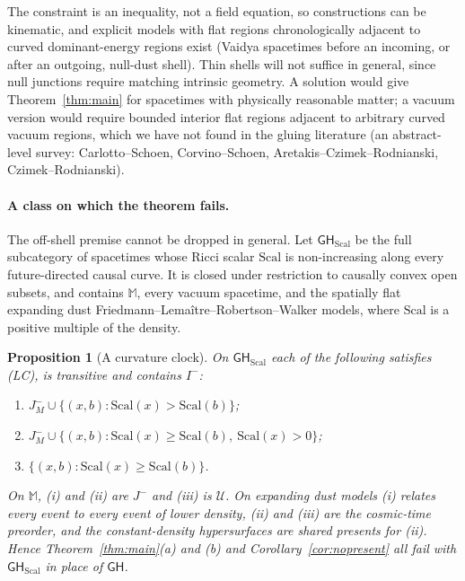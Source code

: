 \documentclass[11pt]{article}
\newtheorem{proposition}[theorem]{Proposition}
\theoremstyle{definition}
\newcommand{\GH}{\mathsf{GH}}
\newcommand{\Mink}{\mathbb M}
\newcommand{\U}{\mathcal U}
\newcommand{\Ichr}{I^{-}}
\newcommand{\Jm}{J^{-}}
\begin{document}
The constraint is an inequality, not a field equation, so constructions can be
kinematic, and explicit models with flat regions chronologically adjacent to
curved dominant-energy regions exist (Vaidya spacetimes before an incoming, or
after an outgoing, null-dust shell). Thin shells will not suffice in general,
since null junctions require matching intrinsic geometry. A solution would
give Theorem~\ref{thm:main} for spacetimes with physically reasonable matter;
a vacuum version would require bounded interior flat regions adjacent to
arbitrary curved vacuum regions, which we have not found in the gluing
literature (an abstract-level survey: Carlotto--Schoen, Corvino--Schoen,
Aretakis--Czimek--Rodnianski, Czimek--Rodnianski).

\paragraph{A class on which the theorem fails.} The off-shell premise cannot be
dropped in general. Let $\GH_{\mathrm{Scal}}$ be the full subcategory of spacetimes whose
Ricci scalar $\mathrm{Scal}$ is non-increasing along every future-directed causal curve.
It is closed under restriction to causally convex open subsets, and contains
$\Mink$, every vacuum spacetime, and the spatially flat expanding dust
Friedmann--Lemaître--Robertson--Walker models, where $\mathrm{Scal}$ is a positive
multiple of the density.

\begin{proposition}[A curvature clock]\label{prop:clock}
On $\GH_{\mathrm{Scal}}$ each of the following satisfies (LC), is transitive and contains
$\Ichr$:
\begin{enumerate}
\item[(i)] $\Jm_M\cup\{(x,b):\mathrm{Scal}(x)>\mathrm{Scal}(b)\}$;
\item[(ii)] $\Jm_M\cup\{(x,b):\mathrm{Scal}(x)\ge \mathrm{Scal}(b),\ \mathrm{Scal}(x)>0\}$;
\item[(iii)] $\{(x,b):\mathrm{Scal}(x)\ge \mathrm{Scal}(b)\}$.
\end{enumerate}
On $\Mink$, (i) and (ii) are $\Jm$ and (iii) is $\U$. On expanding dust models
(i) relates every event to every event of lower density, (ii) and (iii) are
the cosmic-time preorder, and the constant-density hypersurfaces are shared
presents for (ii). Hence Theorem~\ref{thm:main}(a) and (b) and
Corollary~\ref{cor:nopresent} all fail with $\GH_{\mathrm{Scal}}$ in place of $\GH$.
\end{proposition}
\end{document}
